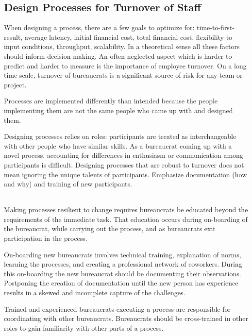 \subsection*{Design Processes for Turnover of Staff\label{sec:turnover}}


When designing a \gls{process}, there are a few goals to optimize for: time-to-first-result, average latency, initial financial cost, total financial cost, flexibility to input conditions, throughput, scalability. In a theoretical sense all these factors should inform decision making. An often neglected aspect which is harder to predict and harder to measure is the importance of employee turnover. On a long time scale, turnover of \glspl{bureaucrat} is a significant source of risk for any team or project. 

Processes are implemented differently than intended because the people implementing them are not the same people who came up with and designed them.

Designing processes relies on roles: participants are treated as interchangeable with other people who have similar skills. As a bureaucrat coming up with a novel process, accounting for differences in enthusiasm or communication among participants is difficult. 
Designing processes that are robust to turnover does not mean ignoring the unique talents of participants. 
Emphasize documentation (how and why) and training of new participants. 



\ \\

Making processes resilient to change requires  bureaucrats be educated beyond the requirements of the immediate task. That education occurs during on-boarding of the bureaucrat, while carrying out the process, and as bureaucrats exit participation in the process. 

On-boarding new bureaucrats involves technical training, explanation of norms, learning the processes, and creating a professional network of coworkers. During this on-boarding the new bureaucrat should be documenting their observations. Postponing the creation of documentation until the new person has experience results in a skewed and incomplete capture of the challenges.

Trained and experienced bureaucrats executing a process are responsible for coordinating with other bureaucrats. Bureaucrats should be cross-trained in other roles to gain familiarity with other parts of a process. 

